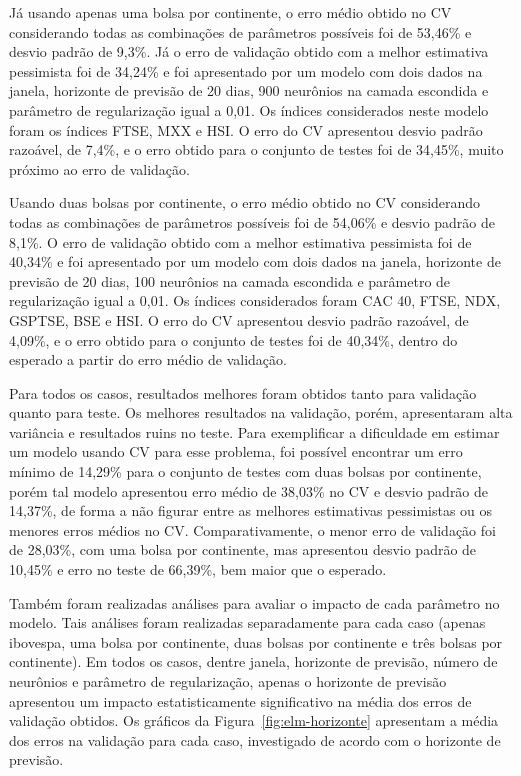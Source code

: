 \documentclass[12pt,a4paper,utf8]{ppgsi}
\begin{document}
        Já usando apenas uma bolsa por continente, o erro médio obtido no CV considerando todas as combinações de parâmetros possíveis foi de 53,46\% e desvio padrão de 9,3\%. Já o erro de validação obtido com a melhor estimativa pessimista foi de 34,24\% e foi apresentado por um modelo com dois dados na janela, horizonte de previsão de 20 dias, 900 neurônios na camada escondida e parâmetro de regularização igual a 0,01. Os índices considerados neste modelo foram os índices FTSE, MXX e HSI. O erro do CV apresentou desvio padrão razoável, de 7,4\%, e o erro obtido para o conjunto de testes foi de 34,45\%, muito próximo ao erro de validação.

        Usando duas bolsas por continente, o erro médio obtido no CV considerando todas as combinações de parâmetros possíveis foi de 54,06\%  e desvio padrão de 8,1\%. O erro de validação obtido com a melhor estimativa pessimista foi de 40,34\% e foi apresentado por um modelo com dois dados na janela, horizonte de previsão de 20 dias, 100 neurônios na camada escondida e parâmetro de regularização igual a 0,01. Os índices considerados foram CAC 40, FTSE, NDX, GSPTSE, BSE e HSI. O erro do CV apresentou desvio padrão razoável, de 4,09\%, e o erro obtido para o conjunto de testes foi de 40,34\%, dentro do esperado a partir do erro médio de validação.

        Para todos os casos, resultados melhores foram obtidos tanto para validação quanto para teste. Os melhores resultados na validação, porém, apresentaram alta variância e resultados ruins no teste. Para exemplificar a dificuldade em estimar um modelo usando CV para esse problema, foi possível encontrar um erro mínimo de 14,29\% para o conjunto de testes com duas bolsas por continente, porém tal modelo apresentou erro médio de 38,03\% no CV e desvio padrão de 14,37\%, de forma a não figurar entre as melhores estimativas pessimistas ou os menores erros médios no CV. Comparativamente, o menor erro de validação foi de 28,03\%, com uma bolsa por continente, mas apresentou desvio padrão de 10,45\% e erro no teste de 66,39\%, bem maior que o esperado.

        Também foram realizadas análises para avaliar o impacto de cada parâmetro no modelo. Tais análises foram realizadas separadamente para cada caso (apenas ibovespa, uma bolsa por continente, duas bolsas por continente e três bolsas por continente). Em todos os casos, dentre janela, horizonte de previsão, número de neurônios e parâmetro de regularização, apenas o horizonte de previsão apresentou um impacto estatisticamente significativo na média dos erros de validação obtidos. Os gráficos da Figura~\ref{fig:elm-horizonte} apresentam a média dos erros na validação para cada caso, investigado de acordo com o horizonte de previsão.
\end{document}

